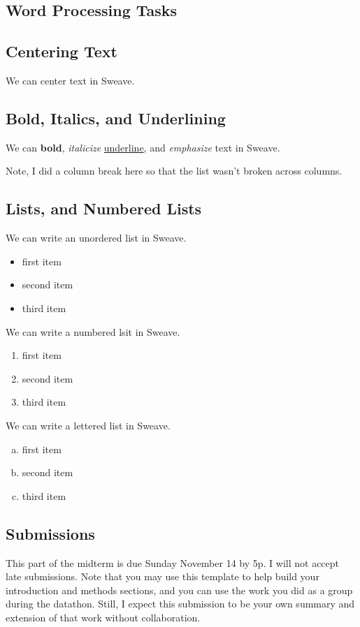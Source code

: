 \documentclass{article}\usepackage[]{graphicx}\usepackage[]{xcolor}
\begin{document}
\begin{multicols}{2}
\section{Word Processing Tasks}

\subsection{Centering Text}
\begin{center}
We can center text in Sweave.
\end{center}

\subsection{Bold, Italics, and Underlining}
We can \textbf{bold}, \textit{italicize} \underline{underline}, and \emph{emphasize} text in Sweave.

Note, I did a column break here so that the list wasn't broken across columns.
\columnbreak
\subsection{Lists, and Numbered Lists}
We can write an unordered list in Sweave.
\begin{itemize}
  \item first item
  \item second item
  \item third item
\end{itemize}
We can write a numbered lsit in Sweave.
\begin{enumerate}
  \item first item
  \item second item
  \item third item
\end{enumerate}
We can write a lettered list in Sweave.
\begin{enumerate}[a.]
  \item first item
  \item second item
  \item third item
\end{enumerate}

\subsection{Submissions}
This part of the midterm is due Sunday November 14 by 5p. I will not accept late submissions. Note that you may use this template to help build your introduction and methods sections, and you can use the work you did as a group during the datathon. Still, I expect this submission to be your own summary and extension of that work without collaboration.


\end{multicols}
\end{document}
